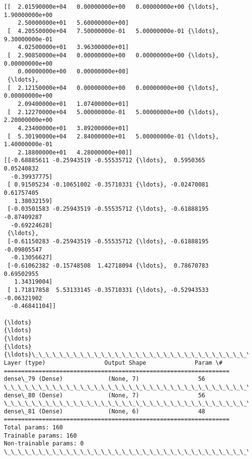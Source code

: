 \documentclass[11pt]{article}
\begin{document}
    \begin{Verbatim}[commandchars=\\\{\}]
[[  2.01590000e+04   0.00000000e+00   0.00000000e+00 {\ldots},   1.90000000e+00
    2.50000000e+01   5.60000000e+00]
 [  4.20550000e+04   7.50000000e-01   5.00000000e-01 {\ldots},   9.30000000e-01
    4.02500000e+01   3.96300000e+01]
 [  2.90850000e+04   0.00000000e+00   0.00000000e+00 {\ldots},   0.00000000e+00
    0.00000000e+00   0.00000000e+00]
 {\ldots}, 
 [  2.12150000e+04   0.00000000e+00   0.00000000e+00 {\ldots},   0.00000000e+00
    2.09400000e+01   1.07400000e+01]
 [  2.12270000e+04   5.00000000e-01   5.00000000e+00 {\ldots},   2.20000000e+00
    4.23400000e+01   3.89200000e+01]
 [  5.30190000e+04   2.84000000e+01   5.00000000e-01 {\ldots},   1.40000000e-01
    2.18800000e+01   4.28000000e+00]]
[[-0.68885611 -0.25943519 -0.55535712 {\ldots},  0.5950365   0.05240832
  -0.39937775]
 [ 0.91505234 -0.10651002 -0.35710331 {\ldots}, -0.02470081  0.61757405
   1.38032159]
 [-0.03501583 -0.25943519 -0.55535712 {\ldots}, -0.61888195 -0.87409287
  -0.69224628]
 {\ldots}, 
 [-0.61150283 -0.25943519 -0.55535712 {\ldots}, -0.61888195 -0.09805547
  -0.13056627]
 [-0.61062382 -0.15748508  1.42718094 {\ldots},  0.78670783  0.69502955
   1.34319004]
 [ 1.71817858  5.53133145 -0.35710331 {\ldots}, -0.52943533 -0.06321902
  -0.46841104]]

{\ldots}
{\ldots}
{\ldots}
{\ldots}
{\ldots}\_\_\_\_\_\_\_\_\_\_\_\_\_\_\_\_\_\_\_\_\_\_\_\_\_\_\_\_\_\_\_\_\_\_\_\_\_\_\_\_\_\_\_\_\_\_\_\_\_\_\_\_\_\_\_\_\_\_\_\_\_\_\_\_\_
Layer (type)                 Output Shape              Param \#   
=================================================================
dense\_79 (Dense)             (None, 7)                 56        
\_\_\_\_\_\_\_\_\_\_\_\_\_\_\_\_\_\_\_\_\_\_\_\_\_\_\_\_\_\_\_\_\_\_\_\_\_\_\_\_\_\_\_\_\_\_\_\_\_\_\_\_\_\_\_\_\_\_\_\_\_\_\_\_\_
dense\_80 (Dense)             (None, 7)                 56        
\_\_\_\_\_\_\_\_\_\_\_\_\_\_\_\_\_\_\_\_\_\_\_\_\_\_\_\_\_\_\_\_\_\_\_\_\_\_\_\_\_\_\_\_\_\_\_\_\_\_\_\_\_\_\_\_\_\_\_\_\_\_\_\_\_
dense\_81 (Dense)             (None, 6)                 48        
=================================================================
Total params: 160
Trainable params: 160
Non-trainable params: 0
\_\_\_\_\_\_\_\_\_\_\_\_\_\_\_\_\_\_\_\_\_\_\_\_\_\_\_\_\_\_\_\_\_\_\_\_\_\_\_\_\_\_\_\_\_\_\_\_\_\_\_\_\_\_\_\_\_\_\_\_\_\_\_\_\_

    \end{Verbatim}

    \begin{center}
    \end{center}
    { \hspace*{\fill} \\}
    
\end{document}
